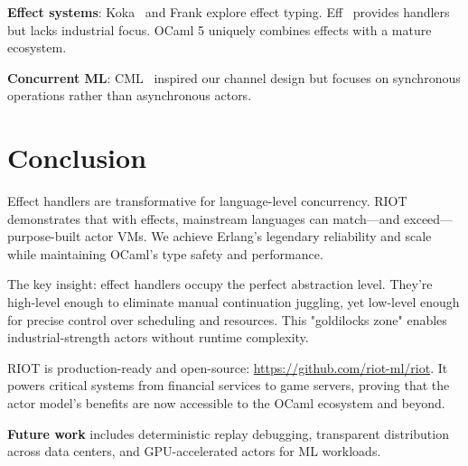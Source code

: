 \documentclass[sigplan,10pt]{acmart}
\begin{document}
\textbf{Effect systems}: Koka~\cite{koka} and Frank explore effect typing. Eff~\cite{eff} provides handlers but lacks industrial focus. OCaml 5 uniquely combines effects with a mature ecosystem.

\textbf{Concurrent ML}: CML~\cite{cml} inspired our channel design but focuses on synchronous operations rather than asynchronous actors.

\vspace{-0.2cm}
\section{Conclusion}

Effect handlers are transformative for language-level concurrency. RIOT demonstrates that with effects, mainstream languages can match—and exceed—purpose-built actor VMs. We achieve Erlang's legendary reliability and scale while maintaining OCaml's type safety and performance.

The key insight: effect handlers occupy the perfect abstraction level. They're high-level enough to eliminate manual continuation juggling, yet low-level enough for precise control over scheduling and resources. This "goldilocks zone" enables industrial-strength actors without runtime complexity.

RIOT is production-ready and open-source: \url{https://github.com/riot-ml/riot}. It powers critical systems from financial services to game servers, proving that the actor model's benefits are now accessible to the OCaml ecosystem and beyond.

\textbf{Future work} includes deterministic replay debugging, transparent distribution across data centers, and GPU-accelerated actors for ML workloads.

\vspace{-0.2cm}


\end{document}
